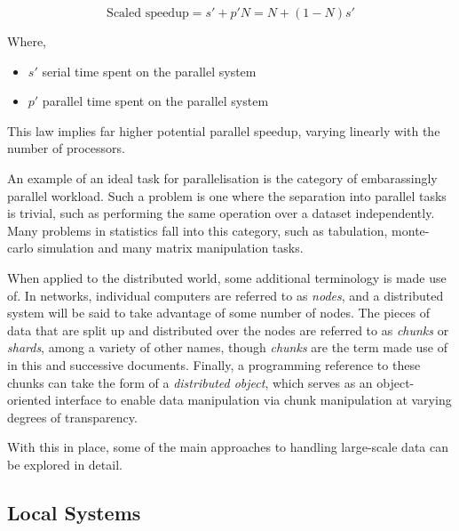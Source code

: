 \begin{equation}
        \label{gustafsonsform}
        \textrm{Scaled speedup} = s' + p'N = N + (1-N)s'
\end{equation}

Where,

\begin{itemize}
        \item \(s'\) serial time spent on the parallel system
        \item \(p'\) parallel time spent on the parallel system
\end{itemize}

This law implies far higher potential parallel speedup, varying linearly with the number of processors.

An example of an ideal task for parallelisation is the category of embarassingly parallel workload.
Such a problem is one where the separation into parallel tasks is trivial, such as performing the same operation over a dataset independently\cite{foster1995parallel}.
Many problems in statistics fall into this category, such as tabulation, monte-carlo simulation and many matrix manipulation tasks.

When applied to the distributed world, some additional terminology is made use of.
In networks, individual computers are referred to as \textit{nodes}, and a distributed system will be said to take advantage of some number of nodes.
The pieces of data that are split up and distributed over the nodes are referred to as \textit{chunks} or \textit{shards}, among a variety of other names, though \textit{chunks} are the term made use of in this and successive documents.
Finally, a programming reference to these chunks can take the form of a \textit{distributed object}, which serves as an object-oriented interface to enable data manipulation via chunk manipulation at varying degrees of transparency.

With this in place, some of the main approaches to handling large-scale data can be explored in detail.

\subsection{Local Systems}

